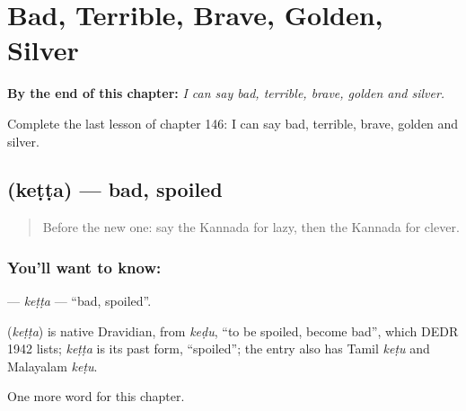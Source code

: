 
\chapter{Bad, Terrible, Brave, Golden, Silver}
\label{ch:ka-bad-terrible-brave-golden-silver}

\begin{chapteropening}
\textbf{By the end of this chapter:} \emph{I can say bad, terrible, brave, golden and silver.}

Complete the last lesson of chapter 146: I can say bad, terrible, brave, golden and silver.
\end{chapteropening}

\section[\texorpdfstring{\kn{ಕೆಟ್ಟ} (keṭṭa)}{ಕೆಟ್ಟ (keṭṭa)}]{ (keṭṭa) — bad, spoiled}

\label{lesson:KA-C146-ketta}



\begin{quote}
Before the new one: say the Kannada for lazy, then the Kannada for clever.
\end{quote}

\subsection*{You'll want to know: }
\textbf{} — \emph{keṭṭa} — \textquotedblleft{}bad, spoiled\textquotedblright{}.

\begin{cousinweb}
\textbf{} (\emph{keṭṭa}) is native Dravidian, from \emph{keḍu}, \textquotedblleft{}to be spoiled, become bad\textquotedblright{}, which DEDR 1942 lists; \emph{keṭṭa} is its past form, \textquotedblleft{}spoiled\textquotedblright{}; the entry also has Tamil \emph{keṭu} and Malayalam \emph{keṭu}.
\end{cousinweb}

\begin{grammarlens}[title={What you've built}]
One more word for this chapter.
\end{grammarlens}

